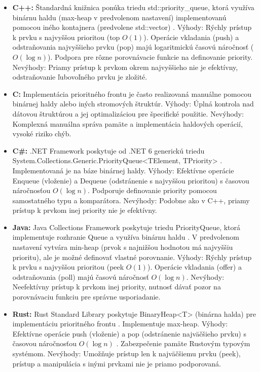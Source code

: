 \documentclass[11pt]{article}
\begin{document}
\begin{itemize}
  \item \textbf{C++:} Štandardná knižnica ponúka triedu std::priority\_queue, ktorá využíva binárnu haldu (max-heap v predvolenom nastavení) implementovanú pomocou iného kontajnera (predvolene std::vector) \cite{c++_containers}.
  Výhody: Rýchly prístup k prvku s najvyššou prioritou (top $O(1)$). Operácie vkladania (push) a odstraňovania najvyššieho prvku (pop) majú logaritmickú časovú náročnosť ($O(\log n)$). Podpora pre rôzne porovnávacie funkcie na definovanie priority.
  Nevýhody: Priamy prístup k prvkom okrem najvyššieho nie je efektívny, odstraňovanie ľubovoľného prvku je zložité.
  \item \textbf{C:} Implementácia prioritného frontu je často realizovaná manuálne pomocou binárnej haldy alebo iných stromových štruktúr.
  Výhody: Úplná kontrola nad dátovou štruktúrou a jej optimalizáciou pre špecifické použitie.
  Nevýhody: Komplexná manuálna správa pamäte a implementácia haldových operácií, vysoké riziko chýb.
  \item \textbf{C\#:} .NET Framework poskytuje od .NET 6 generickú triedu System.Collections.Generic.PriorityQueue<TElement, TPriority> \cite{dotnet_docs}. Implementovaná je na báze binárnej haldy.
  Výhody: Efektívne operácie Enqueue (vloženie) a Dequeue (odstránenie s najvyššou prioritou) s časovou náročnosťou $O(\log n)$. Podporuje definovanie priority pomocou samostatného typu a komparátora.
  Nevýhody: Podobne ako v C++, priamy prístup k prvkom inej priority nie je efektívny.
  \item \textbf{Java:} Java Collections Framework poskytuje triedu PriorityQueue, ktorá implementuje rozhranie Queue a využíva binárnu haldu \cite{java_docs}. V predvolenom nastavení vytvára min-heap (prvok s najnižšou hodnotou má najvyššiu prioritu), ale je možné definovať vlastné porovnanie.
  Výhody: Rýchly prístup k prvku s najvyššou prioritou (peek $O(1)$). Operácie vkladania (offer) a odstraňovania (poll) majú časovú náročnosť $O(\log n)$.
  Nevýhody: Neefektívny prístup k prvkom inej priority, nutnosť dávať pozor na porovnávaciu funkciu pre správne usporiadanie.
  \item \textbf{Rust:} Rust Standard Library poskytuje BinaryHeap<T> (binárna halda) pre implementáciu prioritného frontu \cite{rust_collections}. Implementuje max-heap.
  Výhody: Efektívne operácie push (vloženie) a pop (odstránenie najväčšieho prvku) s časovou náročnosťou $O(\log n)$ \cite{rust_collections}. Zabezpečenie pamäte Rustovým typovým systémom.
  Nevýhody: Umožňuje prístup len k najväčšiemu prvku (peek), prístup a manipulácia s inými prvkami nie je priamo podporovaná.
\end{itemize}
\end{document}
